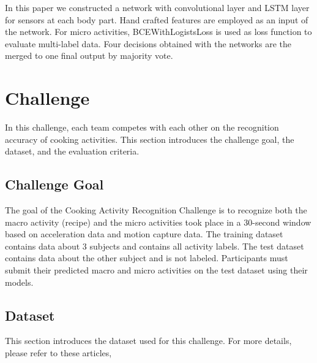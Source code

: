 \documentclass{svmult}
\begin{document}

In this paper we constructed a network with convolutional layer and LSTM layer for sensors at each body part. Hand crafted features are employed as an input of the network. For micro activities, BCEWithLogistsLoss is used as loss function to evaluate multi-label data. Four decisions obtained with the networks are the merged to one final output by majority vote.


\section{Challenge}
\label{sec:challenge}
In this challenge, each team competes with each other on the recognition accuracy of cooking activities. This section introduces the challenge goal, the dataset, and the evaluation criteria.

\subsection{Challenge Goal}
The goal of the Cooking Activity Recognition Challenge is to recognize both the macro activity (recipe) and the micro activities took place in a 30-second window based on acceleration data and motion capture data.
The training dataset contains data about 3 subjects and contains all activity labels. The test dataset contains data about the other subject and is not labeled. Participants must submit their predicted macro and micro activities on the test dataset using their models.

\subsection{Dataset}
\label{sec:dataset}
This section introduces the dataset used for this challenge. For more details, please refer to these articles\cite{ex1,ex2,ex3},
\end{document}
